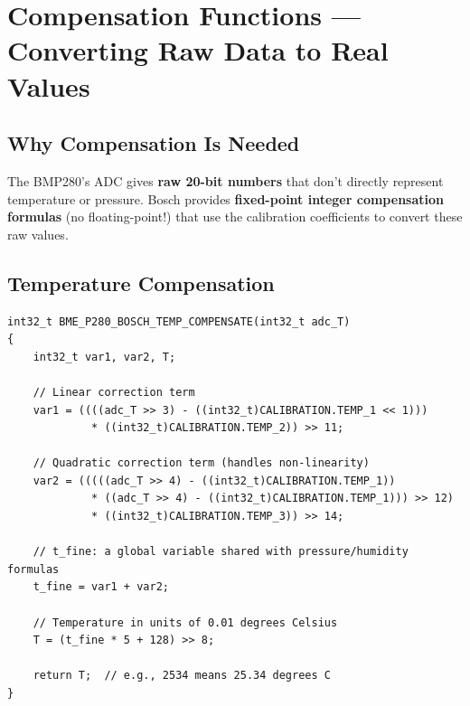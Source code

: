 \documentclass[12pt, a4paper]{article}
\begin{document}
\section{Compensation Functions --- Converting Raw Data to Real Values}

\subsection{Why Compensation Is Needed}

The BMP280's ADC gives \textbf{raw 20-bit numbers} that don't directly represent temperature or pressure. Bosch provides \textbf{fixed-point integer compensation formulas} (no floating-point!) that use the calibration coefficients to convert these raw values.

\subsection{Temperature Compensation}

\begin{codebox}
\begin{lstlisting}[style=CStyle]
int32_t BME_P280_BOSCH_TEMP_COMPENSATE(int32_t adc_T)
{
    int32_t var1, var2, T;

    // Linear correction term
    var1 = ((((adc_T >> 3) - ((int32_t)CALIBRATION.TEMP_1 << 1)))
             * ((int32_t)CALIBRATION.TEMP_2)) >> 11;

    // Quadratic correction term (handles non-linearity)
    var2 = (((((adc_T >> 4) - ((int32_t)CALIBRATION.TEMP_1))
             * ((adc_T >> 4) - ((int32_t)CALIBRATION.TEMP_1))) >> 12)
             * ((int32_t)CALIBRATION.TEMP_3)) >> 14;

    // t_fine: a global variable shared with pressure/humidity formulas
    t_fine = var1 + var2;

    // Temperature in units of 0.01 degrees Celsius
    T = (t_fine * 5 + 128) >> 8;

    return T;  // e.g., 2534 means 25.34 degrees C
}
\end{lstlisting}
\end{codebox}
\end{document}

